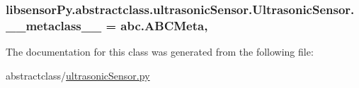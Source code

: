 \subsubsection[{\+\_\+\+\_\+metaclass\+\_\+\+\_\+}]{\setlength{\rightskip}{0pt plus 5cm}libsensor\+Py.\+abstractclass.\+ultrasonic\+Sensor.\+Ultrasonic\+Sensor.\+\_\+\+\_\+metaclass\+\_\+\+\_\+ = abc.\+A\+B\+C\+Meta\hspace{0.3cm}{\ttfamily [static]}, {\ttfamily [private]}}\label{classlibsensorPy_1_1abstractclass_1_1ultrasonicSensor_1_1UltrasonicSensor_ae7e32e5dd87889490c3336fc51dfe70f}


The documentation for this class was generated from the following file\+:\begin{DoxyCompactItemize}
\item 
abstractclass/\hyperlink{abstractclass_2ultrasonicSensor_8py}{ultrasonic\+Sensor.\+py}\end{DoxyCompactItemize}
